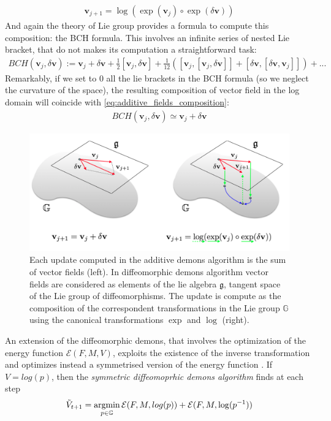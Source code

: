 \begin{align}\label{eq:first_log_composition}
\mathbf{v}_{j+1}= \log(\exp(\mathbf{v}_{j})\circ\exp( \delta\mathbf{v}))
\end{align}
And again the theory of Lie group provides a formula to compute this composition: the BCH formula. This involves an infinite series of nested Lie bracket, that do not makes its computation a straightforward task: 
\begin{align*}
BCH(\mathbf{v}_{j},\delta\mathbf{v}) 
:= 
\mathbf{v}_{j} + \delta\mathbf{v} + \frac{1}{2}[\mathbf{v}_{j},\delta\mathbf{v}] + \frac{1}{12}([\mathbf{v}_{j},[\mathbf{v}_{j},\delta\mathbf{v}]]
+ [\delta\mathbf{v},[\delta\mathbf{v},\mathbf{v}_{j}]])  +... 
\end{align*}
Remarkably, if we set to $0$ all the lie brackets in the BCH formula (so we neglect the curvature of the space), the resulting composition of vector field in the log domain will coincide with \ref{eq:additive_fields_composition}: 
\begin{align*}
BCH(\mathbf{v}_{j},\delta\mathbf{v}) 
\simeq 
\mathbf{v}_{j} + \delta\mathbf{v} 
\end{align*}

	\begin{figure}[!ht]
		\centering
		\includegraphics[scale=0.27]{figures/add_diff_demons.png}
		\caption{Each update computed in the additive demons algorithm is the sum of vector fields (left). In diffeomorphic demons algorithm vector fields are considered as elements of the lie algebra $\mathfrak{g}$, tangent space of the Lie group of diffeomorphisms. The update is compute as the composition of the correspondent transformations in the Lie group $\mathbb{G}$ using the canonical transformations $\exp$ and $\log$ (right).}
		\label{fig:additive_diffeomorphic_demons}
	\end{figure}  
An extension of the diffeomorphic demons, that involves the optimization of the energy function $\mathcal{E}(F,M,V) $, exploits the existence of the inverse transformation and optimizes instead a symmetrised version of the energy function \cite{vercauteren2007non}. If $V = log(p)$, then the \emph{symmetric diffeomoprhic demons algorithm} finds at each step
\begin{align*}
\tilde{V}_{t+1} 
= 
\argmin_{p \in \mathbb{G} } 
\mathcal{E}(F,M,log(p)) + \mathcal{E}(F,M,\log(p^{-1})) 
\end{align*}


